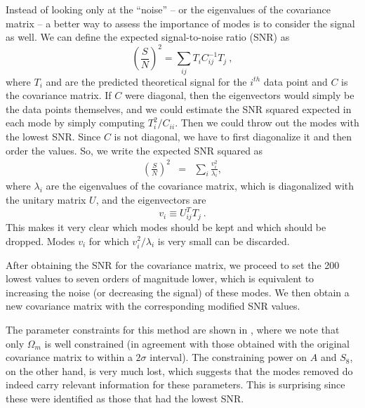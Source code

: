 \documentclass[twocolumn]{\docclass}
\newcommand\be{\begin{equation}}
\newcommand\ee{\end{equation}}
\def\bea{\begin{eqnarray}}
\def\eea{\end{eqnarray}}
\begin{document}
	Instead of looking only at the ``noise'' -- or the eigenvalues of the covariance matrix -- a better way to assess the importance of modes is to consider the signal as well. We can define the expected signal-to-noise ratio (SNR) as
	\be
	\left(\frac{S}{N}\right)^2 = \sum_{ij} T_i C^{-1}_{ij} T_j\
	,\ee
	where $T_i$ and are the predicted theoretical signal for the $i^{th}$ data point and $C$ is the covariance matrix. If $C$ were diagonal, then the eigenvectors would simply be the data points themselves, and we could estimate the SNR squared expected in each mode by simply computing $T_i^2/C_{ii}$. Then we could throw out the modes with the lowest SNR. Since $C$ is not diagonal, we have to first diagonalize it and then order the values. So, we write the expected SNR squared as
	\bea
	\left(\frac{S}{N}\right)^2 %
	&=& \sum_{i} \frac{v_i^2}{\lambda_i}
	,\eea
	where $\lambda_i$ are the eigenvalues of the covariance matrix, which is diagonalized with the unitary matrix $U$, and the eigenvectors are 
	\be
	v_i\equiv U_{ij}^T T_j\
	.\ee
	This makes it very clear which modes should be kept and which should be dropped. Modes $v_i$ for which $v_i^2/\lambda_i$ is very small can be discarded. 
	
	After obtaining the SNR for the covariance matrix, we proceed to set the 200 lowest values to seven orders of magnitude lower, which is equivalent to increasing the noise (or decreasing the signal) of these modes. We then obtain a new covariance matrix with the corresponding modified SNR values. 
	
	The parameter constraints for this method are shown in \figref{eig_snr}, where we note that only $\Omega_m$ is well constrained (in agreement with those obtained with the original covariance matrix to within a $2\sigma$ interval). The constraining power on $A$ and $S_8$, on the other hand, is very much lost, which suggests that the modes removed do indeed carry relevant information for these parameters. This is surprising since these were identified as those that had the lowest SNR.
	
\end{document}
